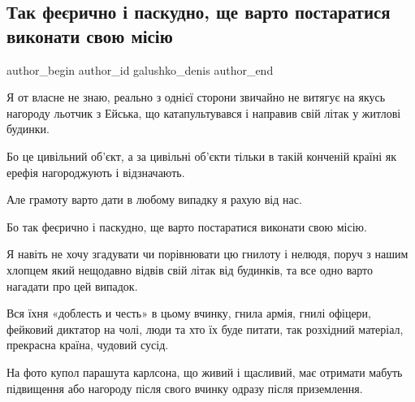 
 
 
 
 

\subsection{Так феєрично і паскудно, ще варто постаратися виконати свою місію}
\label{sec:17_10_2022.fb.galushko_denis.2.tak_fe_richno___pask}

\ifcmt
 author_begin
   author_id galushko_denis
 author_end
\fi

Я от власне не знаю, реально з однієї сторони звичайно не витягує на якусь
нагороду льотчик з Ейська, що катапультувався і направив свій літак у житлові
будинки.

Бо це цивільний об'єкт, а за цивільні об'єкти тільки в такій конченій країні як
ерефія нагороджують і відзначають.

Але грамоту варто дати в любому випадку я рахую від нас.

Бо так феєрично і паскудно, ще варто постаратися виконати свою місію.

Я навіть не хочу згадувати чи порівнювати цю гнилоту і нелюдя, поруч з нашим
хлопцем який нещодавно відвів свій літак від будинків, та все одно варто
нагадати про цей випадок. 

Вся їхня «доблесть и честь» в цьому вчинку, гнила армія, гнилі офіцери,
фейковий диктатор на чолі, люди та хто їх буде питати, так розхідний матеріал,
прекрасна країна, чудовий сусід.

На фото купол парашута карлсона, що живий і щасливий, має отримати мабуть
підвищення або нагороду після свого вчинку одразу після приземлення.

